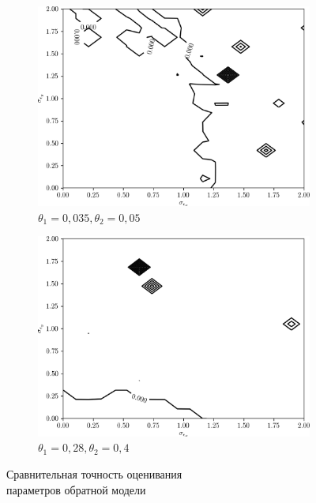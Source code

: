 \begin{figure}[p]
  \begin{subfigure}[b]{\linewidth}
    \centering
    \includegraphics[width=135mm]{fig/nonlinear/inverse/a-0_b-0,035_c-0,005.png}
    \caption{\( \theta_1 = 0{,}035, \theta_2 = 0{,}05 \)}
  \end{subfigure}

  \vspace{2\baselineskip}
  \begin{subfigure}[b]{\linewidth}
    \centering
    \includegraphics[width=135mm]{fig/nonlinear/inverse/a-0_b-0,28_c-0,04.png}
    \caption{\( \theta_1 = 0{,}28, \theta_2 = 0{,}4 \)}
  \end{subfigure}

  \vspace{\baselineskip}
    \caption{
      Сравнительная точность оценивания \\
      параметров обратной модели
    }\label{fig:comparison_nonlinear_inverse}
\end{figure}

